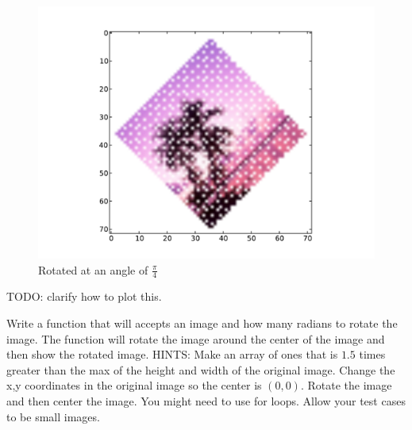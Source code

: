 \begin{figure}[H]
\includegraphics[scale = .5]{rotateimg.pdf}
\caption{Rotated at an angle of $\frac{\pi}{4}$}
\end{figure}

TODO: clarify how to plot this.

\begin{problem}
Write a function that will accepts an image and how many radians to rotate the image.
The function will rotate the image around the center of the image and then show the rotated image.
HINTS: Make an array of ones that is $1.5$ times greater than the max of the height and width of the original image.
Change the x,y coordinates in the original image so the center is $(0,0)$.
Rotate the image and then center the image.
You might need to use for loops.
Allow your test cases to be small images.
\end{problem}



